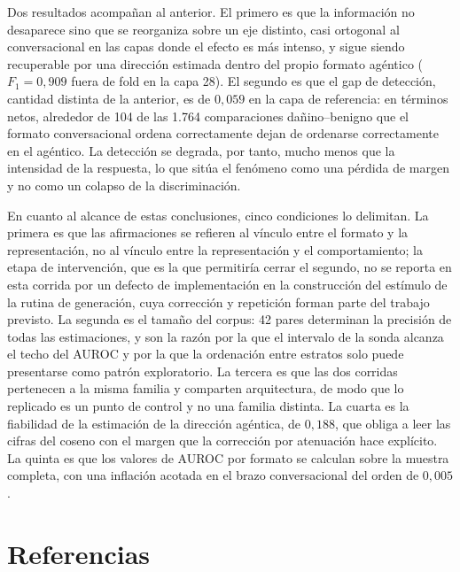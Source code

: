 \documentclass[12pt,a4paper]{article}
\begin{document}
Dos resultados acompañan al anterior. El primero es que la información no desaparece sino que se reorganiza sobre un eje distinto, casi ortogonal al conversacional en las capas donde el efecto es más intenso, y sigue siendo recuperable por una dirección estimada dentro del propio formato agéntico ($F_1 = 0{,}909$ fuera de fold en la capa 28). El segundo es que el gap de detección, cantidad distinta de la anterior, es de $0{,}059$ en la capa de referencia: en términos netos, alrededor de 104 de las 1.764 comparaciones dañino--benigno que el formato conversacional ordena correctamente dejan de ordenarse correctamente en el agéntico. La detección se degrada, por tanto, mucho menos que la intensidad de la respuesta, lo que sitúa el fenómeno como una pérdida de margen y no como un colapso de la discriminación.

En cuanto al alcance de estas conclusiones, cinco condiciones lo delimitan. La primera es que las afirmaciones se refieren al vínculo entre el formato y la representación, no al vínculo entre la representación y el comportamiento; la etapa de intervención, que es la que permitiría cerrar el segundo, no se reporta en esta corrida por un defecto de implementación en la construcción del estímulo de la rutina de generación, cuya corrección y repetición forman parte del trabajo previsto. La segunda es el tamaño del corpus: 42 pares determinan la precisión de todas las estimaciones, y son la razón por la que el intervalo de la sonda alcanza el techo del AUROC y por la que la ordenación entre estratos solo puede presentarse como patrón exploratorio. La tercera es que las dos corridas pertenecen a la misma familia y comparten arquitectura, de modo que lo replicado es un punto de control y no una familia distinta. La cuarta es la fiabilidad de la estimación de la dirección agéntica, de $0{,}188$, que obliga a leer las cifras del coseno con el margen que la corrección por atenuación hace explícito. La quinta es que los valores de AUROC por formato se calculan sobre la muestra completa, con una inflación acotada en el brazo conversacional del orden de $0{,}005$.

\newpage
\section*{Referencias}
\end{document}

